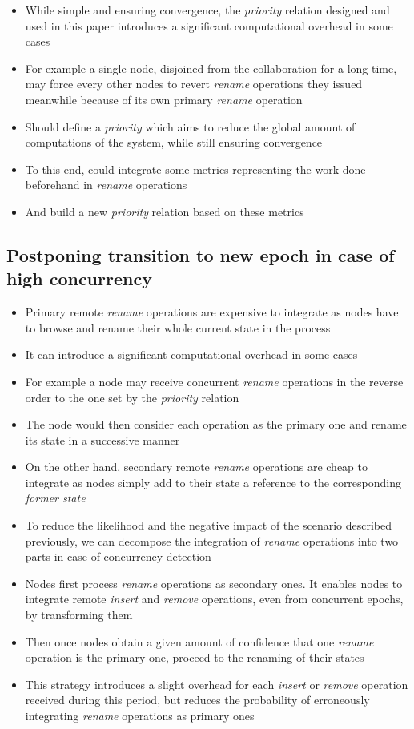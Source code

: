 \documentclass[sigplan,10pt]{acmart}
\begin{document}
\begin{itemize}
    \item While simple and ensuring convergence, the \emph{priority} relation designed and used in this paper introduces a significant computational overhead in some cases
    \item For example a single node, disjoined from the collaboration for a long time, may force every other nodes to revert \emph{rename} operations they issued meanwhile because of its own primary \emph{rename} operation
    \item Should define a \emph{priority} which aims to reduce the global amount of computations of the system, while still ensuring convergence
    \item To this end, could integrate some metrics representing the work done beforehand in \emph{rename} operations
    \item And build a new \emph{priority} relation based on these metrics
\end{itemize}

\subsection{Postponing transition to new epoch in case of high concurrency}
\label{sec:postponing-transition-to-new-epoch}

\begin{itemize}
    \item Primary remote \emph{rename} operations are expensive to integrate as nodes have to browse and rename their whole current state in the process
    \item It can introduce a significant computational overhead in some cases
    \item For example a node may receive concurrent \emph{rename} operations in the reverse order to the one set by the \emph{priority} relation
    \item The node would then consider each operation as the primary one and rename its state in a successive manner
    \item On the other hand, secondary remote \emph{rename} operations are cheap to integrate as nodes simply add to their state a reference to the corresponding \emph{former state}
    \item To reduce the likelihood and the negative impact of the scenario described previously, we can decompose the integration of \emph{rename} operations into two parts in case of concurrency detection
    \item Nodes first process \emph{rename} operations as secondary ones. It enables nodes to integrate remote \emph{insert} and \emph{remove} operations, even from concurrent epochs, by transforming them
    \item Then once nodes obtain a given amount of confidence that one \emph{rename} operation is the primary one, proceed to the renaming of their states
    \item This strategy introduces a slight overhead for each \emph{insert} or \emph{remove} operation received during this period, but reduces the probability of erroneously integrating \emph{rename} operations as primary ones
\end{itemize}
\end{document}
